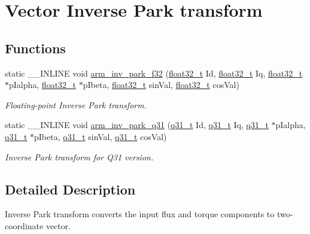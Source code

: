 \hypertarget{group__inv__park}{}\section{Vector Inverse Park transform}
\label{group__inv__park}
\subsection*{Functions}
\begin{DoxyCompactItemize}
\item 
static \+\_\+\+\_\+\+I\+N\+L\+I\+NE void \hyperlink{group__inv__park_gaaf6bef0de21946f774d49df050dd8b05}{arm\+\_\+inv\+\_\+park\+\_\+f32} (\hyperlink{arm__math_8h_a4611b605e45ab401f02cab15c5e38715}{float32\+\_\+t} Id, \hyperlink{arm__math_8h_a4611b605e45ab401f02cab15c5e38715}{float32\+\_\+t} Iq, \hyperlink{arm__math_8h_a4611b605e45ab401f02cab15c5e38715}{float32\+\_\+t} $\ast$p\+Ialpha, \hyperlink{arm__math_8h_a4611b605e45ab401f02cab15c5e38715}{float32\+\_\+t} $\ast$p\+Ibeta, \hyperlink{arm__math_8h_a4611b605e45ab401f02cab15c5e38715}{float32\+\_\+t} sin\+Val, \hyperlink{arm__math_8h_a4611b605e45ab401f02cab15c5e38715}{float32\+\_\+t} cos\+Val)
\begin{DoxyCompactList}\small\item\em Floating-\/point Inverse Park transform. \end{DoxyCompactList}\item 
static \+\_\+\+\_\+\+I\+N\+L\+I\+NE void \hyperlink{group__inv__park_ga0b33822b988a15455773d28440c5579a}{arm\+\_\+inv\+\_\+park\+\_\+q31} (\hyperlink{arm__math_8h_adc89a3547f5324b7b3b95adec3806bc0}{q31\+\_\+t} Id, \hyperlink{arm__math_8h_adc89a3547f5324b7b3b95adec3806bc0}{q31\+\_\+t} Iq, \hyperlink{arm__math_8h_adc89a3547f5324b7b3b95adec3806bc0}{q31\+\_\+t} $\ast$p\+Ialpha, \hyperlink{arm__math_8h_adc89a3547f5324b7b3b95adec3806bc0}{q31\+\_\+t} $\ast$p\+Ibeta, \hyperlink{arm__math_8h_adc89a3547f5324b7b3b95adec3806bc0}{q31\+\_\+t} sin\+Val, \hyperlink{arm__math_8h_adc89a3547f5324b7b3b95adec3806bc0}{q31\+\_\+t} cos\+Val)
\begin{DoxyCompactList}\small\item\em Inverse Park transform for Q31 version. \end{DoxyCompactList}\end{DoxyCompactItemize}


\subsection{Detailed Description}
Inverse Park transform converts the input flux and torque components to two-\/coordinate vector.

